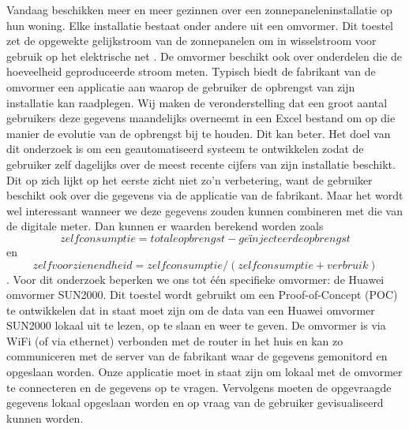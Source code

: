 \documentclass{hogent-article}
\begin{document}
    Vandaag beschikken meer en meer gezinnen over een zonnepaneleninstallatie op hun woning. Elke installatie bestaat onder andere uit een omvormer. Dit toestel zet de opgewekte gelijkstroom van de zonnepanelen om in wisselstroom voor gebruik op het elektrische net \autocite{Teodorescu_2011}. De omvormer beschikt ook over onderdelen die de hoeveelheid geproduceerde stroom meten. Typisch biedt de fabrikant van de omvormer een applicatie aan waarop de gebruiker de opbrengst van zijn installatie kan raadplegen. Wij maken de veronderstelling dat een groot aantal gebruikers deze gegevens maandelijks overneemt in een Excel bestand om op die manier de evolutie van de opbrengst bij te houden.\newline
    Dit kan beter. Het doel van dit onderzoek is om een geautomatiseerd systeem te ontwikkelen zodat de gebruiker zelf dagelijks over de meest recente cijfers van zijn installatie beschikt. Dit op zich lijkt op het eerste zicht niet zo'n verbetering, want de gebruiker beschikt ook over die gegevens via de applicatie van de fabrikant. Maar het wordt wel interessant wanneer we deze gegevens zouden kunnen combineren met die van de digitale meter. Dan kunnen er waarden berekend worden zoals \begin{equation*}zelfconsumptie = totale opbrengst - geïnjecteerde opbrengst\end{equation*} en \begin{equation*}zelfvoorzienendheid = zelfconsumptie / (zelfconsumptie + verbruik)\end{equation*}.\newline
    Voor dit onderzoek beperken we ons tot één specifieke omvormer: de Huawei omvormer SUN2000. Dit toestel wordt gebruikt om een Proof-of-Concept (POC) te ontwikkelen dat in staat moet zijn om de data van een Huawei omvormer SUN2000 lokaal uit te lezen, op te slaan en weer te geven.\newline
    De omvormer is via WiFi (of via ethernet) verbonden met de router in het huis en kan zo communiceren met de server van de fabrikant waar de gegevens gemonitord en opgeslaan worden. Onze applicatie moet in staat zijn om lokaal met de omvormer te connecteren en de gegevens op te vragen. Vervolgens moeten de opgevraagde gegevens lokaal opgeslaan worden en op vraag van de gebruiker gevisualiseerd kunnen worden.\newline
\end{document}

